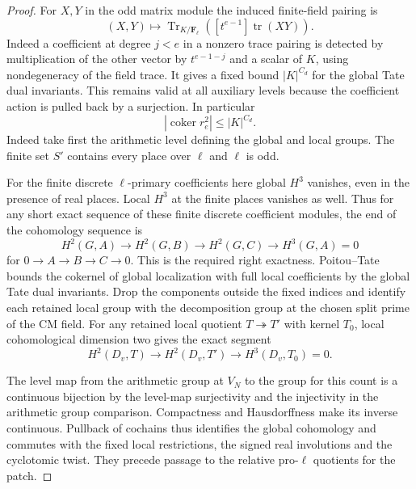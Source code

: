 \begin{proof}
For \(X,Y\) in the odd matrix module the induced finite-field
pairing is
\[
 (X,Y)\longmapsto
 \operatorname{Tr}_{K/\mathbf F_\ell}\!\left([t^{e-1}]
                    \operatorname{tr}(XY)\right).
\]
Indeed a coefficient at degree \(j<e\) in a nonzero trace pairing
is detected by multiplication of the other vector by \(t^{e-1-j}\)
and a scalar of \(K\), using nondegeneracy of the field trace.
It gives a fixed
bound \(|K|^{C_d}\) for the global Tate dual
invariants. This remains valid at all auxiliary
levels because the coefficient action is
pulled back by a surjection. In particular
\[
          |\operatorname{coker} r^2_e|\le |K|^{C_d}.
 \tag{13}\label{eq:local-patch-13}
\]
Indeed take first the arithmetic level defining the global and local
groups. The finite set \(S'\) contains every place over \(\ell\) and
\(\ell\) is odd.

For the finite discrete \(\ell\)-primary coefficients
here global \(H^3\) vanishes, even in the presence of real places.
Local \(H^3\) at the finite places vanishes as well. Thus for any short exact sequence of these finite discrete coefficient modules, the end of the cohomology sequence is
\[
 H^2(G,A)\longrightarrow H^2(G,B)\longrightarrow H^2(G,C)\longrightarrow H^3(G,A)=0
\]
for \(0\to A\to B\to C\to0\). This is the required right exactness.
Poitou--Tate bounds the cokernel of
global localization with full local coefficients
by the global Tate dual invariants. Drop the components outside the fixed indices and identify each retained local group with the decomposition group at the chosen split prime of the CM field. For any retained local quotient \(T\twoheadrightarrow T'\) with kernel \(T_0\), local cohomological dimension two gives the exact segment 
\[
 H^2(D_v,T)\longrightarrow H^2(D_v,T')\longrightarrow H^3(D_v,T_0)=0.
\]

The level map from the arithmetic group at \(V_N\) to the group
for this count is a continuous bijection by the level-map
surjectivity and the injectivity in the arithmetic group comparison. Compactness and Hausdorffness make its inverse
continuous. Pullback of cochains thus identifies the global cohomology
and commutes with the fixed local restrictions, the signed real
involutions and the cyclotomic twist.  They precede passage to
the relative pro-\(\ell\) quotients for the patch.


\end{proof}
